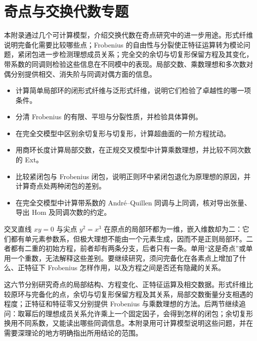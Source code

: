 
\chapter{奇点与交换代数专题}
\label{b3:app:C}

\begin{chapterabstract}
	本附录通过几个可计算模型，介绍交换代数在奇点研究中的进一步用途。形式纤维说明完备化需要比较哪些点；Frobenius 的自由性与分裂使正特征运算转为模论问题，紧闭包进一步检测理想成员关系；完全交的余切与切复形保留方程及其变化，带系数的同调则检验这些信息在不同模中的表现。局部交数、乘数理想和多次数对偶分别提供相交、消失阶与同调对偶方面的信息。
\end{chapterabstract}

\begin{learninggoals}
	\begin{itemize}
		\item 计算简单局部环的闭形式纤维与泛形式纤维，说明它们检验了卓越性的哪一项条件。
		\item 分清 Frobenius 的有限、平坦与分裂性质，并检验具体算例。
		\item 在完全交模型中区别余切复形与切复形，计算超曲面的一阶方程扰动。
		\item 用商环长度计算局部交数，在正规交叉模型中计算乘数理想，并比较不同次数的 Ext。
		\item 比较紧闭包与 Frobenius 闭包，说明正则环中紧闭包退化为原理想的原因，并计算奇点处两种闭包的差别。
		\item 在完全交模型中计算带系数的 André--Quillen 同调与上同调，核对导出张量、导出 Hom 及同调次数的约定。
	\end{itemize}
\end{learninggoals}

交叉直线 \(xy=0\) 与尖点 \(y^2=x^3\) 在原点的局部环都为一维，嵌入维数却为二：它们都有单元素参数系，但极大理想不能由一个元素生成，因而不是正则局部环。二者都有二重的初始方程，前者却有两条分支，后者只有一条。单用“这是奇点”或单用一个重数，无法解释这些差别。要继续研究，须问完备化在各素点上增加了什么、正特征下 Frobenius 怎样作用，以及方程之间是否还有隐藏的关系。

\ProseParagraphBreak

这六节分别研究奇点的局部结构、方程变化、正特征运算及相交数据。形式纤维比较原环与完备化的点，余切与切复形保留方程及其关系，局部交数衡量分支相遇的程度；正特征和特征零又分别提供 Frobenius 与乘数理想的方法。后两节继续追问：取幂后的理想成员关系允许乘上一个固定因子，会得到怎样的闭包；余切复形换用不同系数，又能读出哪些同调信息。本附录用可计算模型说明这些问题，并在需要深理论的地方明确指出所用结论的范围。

